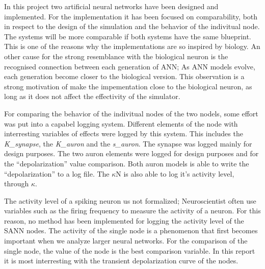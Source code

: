 In this project two artificial neural networks have been designed and implemented. 
For the implementation it has been focused on comparability, both in respect to the design of the simulation and the behavior of the indivitual node.
The systems will be more comparable if both systems have the same blueprint. 
This is one of the reasons why the implementations are so inspired by biology.
An other cause for the strong resemblance with the biological neuron is the recognised connection between each generation of ANN; As ANN models evolve, each generation become closer to the biological version. %
This observation is a strong motivation of make the impementation close to the biological neuron, as long as it does not affect the effectivity of the simulator. %

For comparing the behavior of the indivitual nodes of the two nodels, some effort was put into a capabel logging system. 
Different elements of the node with interresting variables of effects were logged by this system. This includes the \emph{K\_synapse}, the \emph{K\_auron} and the \emph{s\_auron}.
The synapse was logged mainly for design purposes. The two auron elements were logged for design purposes and for the ``depolarization'' value comparison.
Both auron models is able to write the ``depolarization'' to a log file. The $\kappa$N is also able to log it's activity level, through $\kappa$.

The activity level of a spiking neuron us not formalized; Neuroscientist often use variables such as the firing frequency to measure the activity of a neuron.
For this reason, no method has been implemented for logging the activity level of the SANN nodes.
The activity of the single node is a phenomenon that first becomes important when we analyze larger neural networks.
For the comparison of the single node, the value of the node is the best comparison variable. 
In this report it is most interresting with the transient depolarization curve of the nodes.




